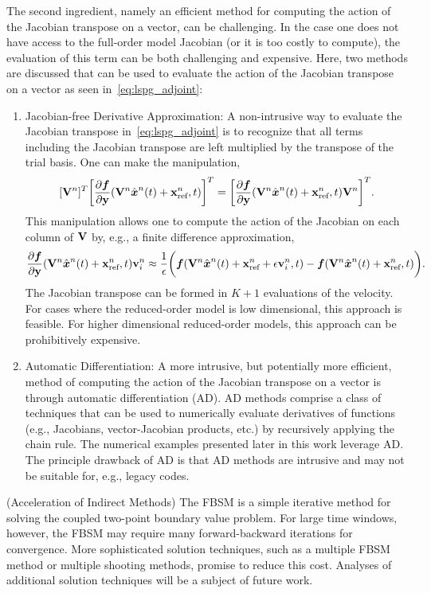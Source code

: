 The second ingredient, namely an efficient method for computing the action of the Jacobian transpose on a vector, can be challenging. 
In the case one does not have access to the full-order model Jacobian (or it is too costly to compute), the evaluation of this term can be both challenging and expensive. Here, two methods are discussed that can be used to evaluate the action of the Jacobian transpose on a vector as seen in~\eqref{eq:lspg_adjoint}:
\begin{enumerate}
\item Jacobian-free Derivative Approximation: A non-intrusive way to evaluate the Jacobian transpose in~\eqref{eq:lspg_adjoint} is to recognize that all terms including the Jacobian transpose are left multiplied by the transpose of the trial basis. One can make the manipulation,
$$[\mathbf {V}^{n}]^T \bigg[\frac{\partial \boldsymbol f}{\partial \mathbf{y}} (\mathbf {V}^{n} \hat{ \boldsymbol x}^{n}(t) + \mathbf{x}_\text{ref}^{n},t)\bigg]^T = \bigg[  \frac{\partial \boldsymbol f}{\partial \mathbf{y}} (\mathbf {V}^{n} \hat{ \boldsymbol x}^{n}(t) + \mathbf{x}_\text{ref}^{n},t) \mathbf {V}^{n} \bigg]^T.$$
This manipulation allows one to compute the action of the Jacobian on each column of $\mathbf {V}$ by, e.g., a finite difference approximation,
$$\frac{\partial \boldsymbol f}{\partial \mathbf{y}}(\mathbf {V}^{n} \hat{ \boldsymbol x}^{n}(t) + \mathbf{x}_\text{ref}^{n},t) \mathbf{v}_i^n \approx \frac{1}{\epsilon}\bigg( \boldsymbol f(\mathbf {V}^{n}\hat{ \boldsymbol x}^{n}(t) + \mathbf{x}_\text{ref}^{n} + \epsilon \mathbf{v}_i^n,t) - \boldsymbol f(\mathbf {V}^{n} \hat{ \boldsymbol x}^{n}(t) + \mathbf{x}_\text{ref}^{n},t) \bigg).$$
The Jacobian transpose can be formed in $K+1$ evaluations of the velocity. For cases where the reduced-order model is low dimensional, this approach is feasible. For higher dimensional reduced-order models, this approach can be prohibitively expensive.

\item Automatic Differentiation: A more intrusive, but potentially more efficient, method of computing the action of the Jacobian transpose on a vector is through automatic differentiation (AD). AD methods comprise a class of techniques that can be used to numerically evaluate derivatives of functions (e.g., Jacobians, vector-Jacobian products, etc.) by recursively applying the chain rule. The numerical examples presented later in this work leverage AD. The principle drawback of AD is that AD methods are intrusive and may not be suitable for, e.g., legacy codes.  
\end{enumerate}

\begin{remark}\label{remark:fbsm}(Acceleration of Indirect Methods)
The FBSM is a simple iterative method for solving the coupled two-point boundary value problem. For large time windows, however, the FBSM may require many 
forward-backward iterations for convergence. More sophisticated solution techniques, such as a multiple FBSM method or multiple shooting methods, promise 
to reduce this cost. Analyses of additional solution techniques will be a subject of future work.
\end{remark}

